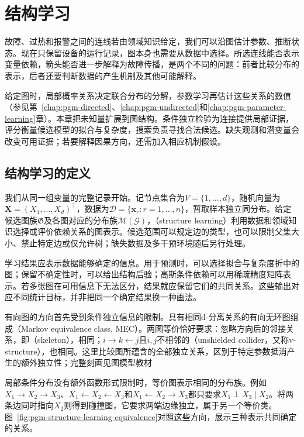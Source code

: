 \chapter{结构学习}
\label{chap:pgm-structure-learning}

故障、过热和报警之间的连线若由领域知识给定，我们可以沿图估计参数、推断状态。现在只保留设备的运行记录，图本身也需要从数据中选择。所选连线能否表示变量依赖，箭头能否进一步解释为故障传播，是两个不同的问题：前者比较分布的表示，后者还要判断数据的产生机制及其他可能解释。

给定图时，局部概率关系决定联合分布的分解，参数学习再估计这些关系的数值（参见第~\ref{chap:pgm-directed}、\ref{chap:pgm-undirected}和\ref{chap:pgm-parameter-learning}章）。本章把未知量扩展到图结构。条件独立检验为连接提供局部证据，评分衡量候选模型的拟合与复杂度，搜索负责寻找合法候选。缺失观测和潜变量会改变可用证据；若要解释因果方向，还需加入相应机制假设。

\section{结构学习的定义}
\label{sec:pgm-structure-learning-definition}

我们从同一组变量的完整记录开始。记节点集合为$V=\{1,\ldots,d\}$，随机向量为$\bm{X}=(X_1,\ldots,X_d)^{\top}$，数据为$\mathcal{D}=\{\bm{x}_r:r=1,\ldots,n\}$，暂取样本独立同分布。给定候选图族$\mathfrak{G}$及各图对应的分布族$\mathcal{M}(\mathcal{G})$，（structure learning）利用数据和领域知识选择或评价依赖关系的图表示。候选范围可以规定边的类型，也可以限制父集大小、禁止特定边或仅允许树；缺失数据及多干预环境随后另行处理。

学习结果应表示数据能够确定的信息。用于预测时，可以选择拟合与复杂度折中的图；保留不确定性时，可以给出结构后验；高斯条件依赖可以用稀疏精度矩阵表示。若多张图在可用信息下无法区分，结果就应保留它们的共同关系。这些输出对应不同统计目标，并非把同一个确定结果换一种画法。

有向图的方向首先受到条件独立信息的限制。具有相同d-分离关系的有向无环图组成（Markov equivalence class, MEC）。两图等价恰好要求：忽略方向后的邻接关系，即（skeleton），相同；$i\to k\leftarrow j$且$i,j$不相邻的（unshielded collider，又称v-structure），也相同。这里比较图所蕴含的全部独立关系，区别于特定参数抵消产生的额外独立性；完整刻画见图模型教材

局部条件分布没有额外函数形式限制时，等价图表示相同的分布族。例如$X_1\to X_2\to X_3$、$X_1\leftarrow X_2\leftarrow X_3$和$X_1\leftarrow X_2\to X_3$都只要求$X_1\perp X_3\mid X_2$。将两条边同时指向$X_2$则得到碰撞图，它要求两端边缘独立，属于另一个等价类。图~\ref{fig:pgm-structure-learning-equivalence}对照这些方向，展示三种表示共同确定的关系。

